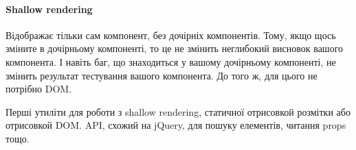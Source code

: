 \paragraph{Shallow rendering}

Відображає тільки сам компонент, без дочірніх компонентів. Тому, якщо щось зміните в дочірньому компоненті, то це не змінить неглибокий висновок вашого компонента. І навіть баг, що знаходиться у вашому дочірньому компоненті, не змінить результат тестування вашого компонента. До того ж, для цього не потрібно DOM.

Перші утиліти для роботи з shallow rendering, статичної отрисовкой розмітки або отрисовкой DOM.
API, схожий на jQuery, для пошуку елементів, читання props тощо.
